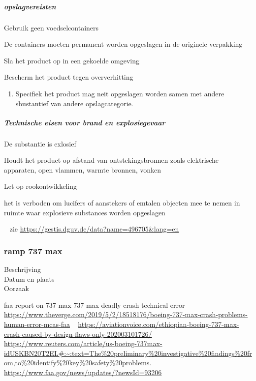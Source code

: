 \documentclass{article}
\begin{document}
\subparagraph{opslagvereisten}
\begin{description}
\item Gebruik geen voedselcontainers
\item De containers moeten permanent worden opgeslagen in de originele verpakking
\item Sla het product op in een gekoelde omgeving
\item Bescherm het product tegen oververhitting
\begin{enumerate}
\item Specifiek  het product mag neit opgeslagen worden samen met andere sbustantief van andere opslagcategorie.
\end{enumerate}
\end{description}
\subparagraph{Technische eisen voor brand en explosiegevaar}
\begin{description}
\item De substantie is exlosief
\item Houdt het product op afstand van ontstekingsbronnen zoals elektrische apparaten,  open vlammen, warmte bronnen, vonken
\item Let op rookontwikkeling
\item het is verboden om lucifers of aanstekers of emtalen objecten mee te nemen in ruimte waar explosieve substances  worden opgeslagen
\end{description}

~\cite{guvlang}
zie \url{https://gestis.dguv.de/data?name=496705&lang=en}

\subsubsection{ramp 737 max}
\begin{description}
\item[Beschrijving]
\item[Datum en plaats] 
\item[Oorzaak]
\end{description}
faa report on 737 max
737 max deadly crash technical error
~\cite{mcasfail}
\url{https://www.theverge.com/2019/5/2/18518176/boeing-737-max-crash-problems-human-error-mcas-faa}
~\cite{aviationvoicecrashethio}
\url{https://aviationvoice.com/ethiopian-boeing-737-max-crash-caused-by-design-flaws-only-202003101726/}
~\cite{boeing737problems}
\url{https://www.reuters.com/article/us-boeing-737max-idUSKBN20T2EL#:~:text=The%20preliminary%20investigative%20findings%20from,to%20identify%20key%20safety%20problems.}
~\cite{faaupdate}
\url{https://www.faa.gov/news/updates/?newsId=93206}
\end{document}
